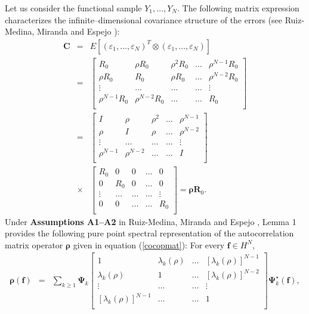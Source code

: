 \documentclass[11pt,a4paper]{article}
\begin{document}
Let us consider the functional sample  $Y_{1},\dots, Y_{N}.$  The  following matrix expression characterizes the infinite--dimensional  covariance structure of the errors (see Ruiz-Medina,  Miranda and  Espejo \cite{RuizMedinaMirandaEspejo19}):
 \begin{eqnarray}\mathbf{C}&=&E\left[\left(\varepsilon_{1},\dots,  \varepsilon_{N} \right)^{T}\otimes \left(\varepsilon_{1},\dots,  \varepsilon_{N}\right)\right]\nonumber\\
  &=&\left[\begin{array}{ccccc}R_{0} & \rho R_{0} &       \rho^{2} R_{0} & \ldots & \rho^{N-1} R_{0} \\
 \rho R_{0} & R_{0} & \rho R_{0} & \ldots & \rho^{N-2} R_{0}\\
\vdots & \ldots & \ldots & \ldots & \vdots\\
\rho^{N-1} R_{0} & \rho^{N-2} R_{0}&\ldots   &\ldots & R_{0}\\
 \end{array}\right]\nonumber\\&=& \left[\begin{array}{ccccc} I & \rho  &       \rho^{2}  & \ldots & \rho^{N-1}  \\
 \rho  & I & \rho  & \ldots & \rho^{N-2} \\
\vdots & \ldots & \ldots & \ldots & \vdots\\
\rho^{N-1}  & \rho^{N-2} &\ldots   &\ldots & I\\
 \end{array}\right] \nonumber\\
 &\times &\left[\begin{array}{ccccc}R_{0} & 0 &       0& \ldots & 0\\
 0 & R_{0} & 0 & \ldots & 0\\
\vdots & \ldots & \ldots & \ldots & \vdots\\
0 & 0&\ldots   &\ldots & R_{0}\\
 \end{array}\right]= \boldsymbol{\rho}\mathbf{R}_{0}.
 \label{cocopmat}
\end{eqnarray}
\noindent Under \textbf{Assumptions  A1--A2} in Ruiz-Medina,  Miranda and  Espejo \cite{RuizMedinaMirandaEspejo19}, Lemma 1 provides the
following pure point spectral representation of the autocorrelation matrix operator $\boldsymbol{\rho}$ given in equation  (\ref{cocopmat}):
For  every $\mathbf{f}\in H^{N},$
\begin{eqnarray}
\boldsymbol{\rho}(\mathbf{f})&=&
\sum_{k\geq 1}\boldsymbol{\Psi}_{k}\left[\begin{array}{cccc}1 & \lambda_{k}(\rho) &        \ldots & \left[\lambda_{k}(\rho)\right]^{N-1}  \\
 \lambda_{k}(\rho)  &1 &  \ldots & \left[\lambda_{k}(\rho)\right]^{N-2}\\
\vdots & \ldots &  \ldots & \vdots\\
\left[\lambda_{k}(\rho)\right]^{N-1}
  & \ldots   &\ldots &1\\
 \end{array}\right]\boldsymbol{\Psi}_{k}^{\star}(\mathbf{f}),
\end{eqnarray}
\end{document}
